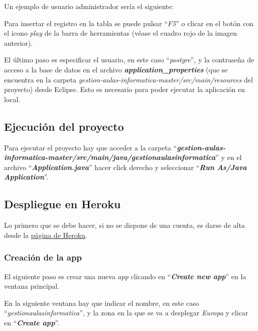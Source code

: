 Un ejemplo de usuario administrador sería el siguiente:


Para insertar el registro en la tabla se puede pulsar ``\textit{F5}'' o clicar en el botón con el icono \textit{play} de la barra de herramientas (véase el cuadro rojo de la imagen anterior).

El último paso es especificar el usuario, en este caso ``\textit{postgre}'', y la contraseña de acceso a la base de datos en el archivo \textbf{\textit{application\_properties}} (que se encuentra en la carpeta \textit{gestion-aulas-informatica-master/src/main/resources} del proyecto) desde Eclipse. Esto es necesario para poder ejecutar la aplicación en local.


\subsection{Ejecución del proyecto}
Para ejecutar el proyecto hay que acceder a la carpeta ``\textbf{\textit{gestion-aulas-informatica-master/src/main/java/gestionaulasinformatica}}'' y en el archivo ``\textbf{\textit{Application.java}}'' hacer click derecho y seleccionar ``\textbf{\textit{Run As/Java Application}}''.


\subsection{Despliegue en Heroku}
Lo primero que se debe hacer, si no se dispone de una cuenta, es darse de alta desde la \href{https://www.heroku.com/}{página de Heroku}.

\subsubsection{Creación de la app}
El siguiente paso es crear una nueva \textit{app} clicando en ``\textbf{\textit{Create new app}}'' en la ventana principal.


En la siguiente ventana hay que indicar el nombre, en este caso ``\textit{gestionaulasinformatica}'', y la zona en la que se va a desplegar \textit{Europa} y clicar en ``\textbf{\textit{Create app}}''.

